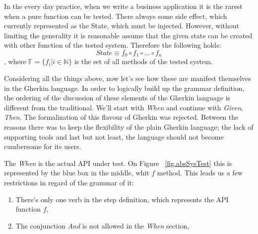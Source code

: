 \documentclass[conference]{IEEEtran}
\begin{document}
In the every day practice, when we write a business application it is the rarest when a pure function can be tested. There always some side effect, which currently represented as the State, which must be injected. However, without limiting the generality it is reasonable assume that the given state can be created with other function of the tested system. Therefore the following holds:
\begin{equation} \label{eq.stateAsComposition}
    State \equiv f_{0} \circ f_{1} \circ ... \circ f_{n}
\end{equation}
, where \( \mathbb{F} = \{ f_{i} | i \in \mathbb{N} \} \) is the set of all methods of the tested system.

Considering all the things above, now let's see how these are manifest themselves in the Gherkin language. In order to logically build up the grammar definition, the ordering of the discussion of these elements of the Gherkin language is different from the traditional. We'll start with \textit{When} and continue with \textit{Given}, \textit{Then}. The formalization of this flavour of Gherkin was rejected. Between the reasons there was to keep the flexibility of the plain Gherkin language; the lack of supporting tools and last but not least, the language should not become cumbersome for its users.

The \textit{When} is the actual API under test. On Figure ~\ref{fig.absSysTest} this is represented by the blue box in the middle, whit \(f\) method. This leads us a few restrictions in regard of the grammar of it:
\begin{enumerate}[label=w.\arabic*]
    \item There's only one verb in the step definition, which represents the API function \(f\),
    \item The conjunction \textit{And} is not allowed in the \textit{When} section,
\end{enumerate}
\end{document}
